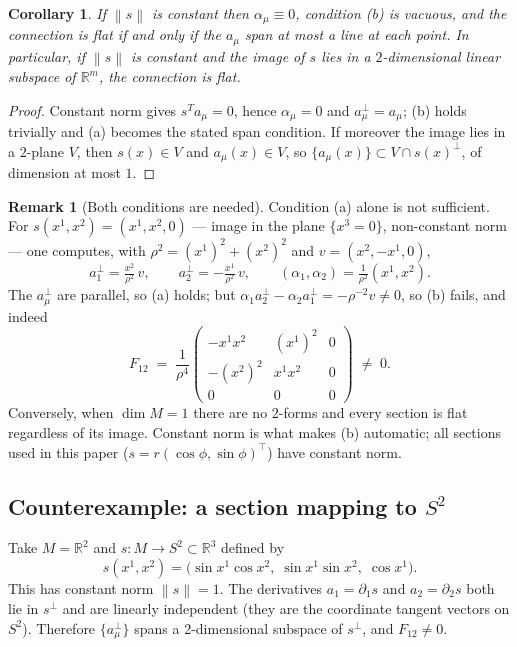 \documentclass[11pt, a4paper]{article}
\theoremstyle{plain}
\newtheorem{corollary}[theorem]{Corollary}
\theoremstyle{definition}
\newtheorem{remark}[theorem]{Remark}
\newcommand{\R}{\mathbb{R}}
\newcommand{\del}{\partial}
\newcommand{\norm}[1]{\left\|#1\right\|}
\begin{document}
\begin{corollary}\label{cor:flat-constant-norm}
If $\norm{s}$ is constant then $\alpha_\mu \equiv 0$, condition (b) is vacuous,
and the connection is flat if and only if the $a_\mu$ span at most a line at each
point. In particular, if $\norm{s}$ is constant and the image of $s$ lies in a
$2$-dimensional linear subspace of $\R^m$, the connection is flat.
\end{corollary}

\begin{proof}
Constant norm gives $s^T a_\mu = 0$, hence $\alpha_\mu = 0$ and
$a_\mu^\perp = a_\mu$; (b) holds trivially and (a) becomes the stated span
condition. If moreover the image lies in a $2$-plane $V$, then $s(x) \in V$ and
$a_\mu(x) \in V$, so $\{a_\mu(x)\} \subset V \cap s(x)^\perp$, of dimension at
most $1$.
\end{proof}

\begin{remark}[Both conditions are needed]
Condition (a) alone is not sufficient. For $s(x^1,x^2) = (x^1,x^2,0)$ --- image
in the plane $\{x^3=0\}$, non-constant norm --- one computes, with
$\rho^2 = (x^1)^2+(x^2)^2$ and $v = (x^2,-x^1,0)$,
\[
  a_1^\perp = \tfrac{x^2}{\rho^2}\,v, \qquad
  a_2^\perp = -\tfrac{x^1}{\rho^2}\,v, \qquad
  (\alpha_1,\alpha_2) = \tfrac{1}{\rho^2}(x^1,x^2).
\]
The $a_\mu^\perp$ are parallel, so (a) holds; but
$\alpha_1 a_2^\perp - \alpha_2 a_1^\perp = -\rho^{-2} v \neq 0$, so (b) fails,
and indeed
\[
  F_{12} \;=\; \frac{1}{\rho^4}
  \begin{pmatrix} -x^1x^2 & (x^1)^2 & 0 \\
                  -(x^2)^2 & x^1x^2 & 0 \\
                  0 & 0 & 0 \end{pmatrix} \;\neq\; 0 .
\]
Conversely, when $\dim M = 1$ there are no $2$-forms and every section is flat
regardless of its image. Constant norm is what makes (b) automatic; all sections
used in this paper ($s = r(\cos\phi,\sin\phi)^\top$) have constant norm.
\end{remark}

\subsection{Counterexample: a section mapping to $S^2$}

Take $M = \R^2$ and $s: M \to S^2 \subset \R^3$ defined by
\[
  s(x^1,x^2) = \bigl(\sin x^1\cos x^2,\;\sin x^1\sin x^2,\;\cos x^1\bigr).
\]
This has constant norm $\norm{s} = 1$. The derivatives $a_1 = \del_1 s$ and
$a_2 = \del_2 s$ both lie in $s^\perp$ and are linearly independent (they are the
coordinate tangent vectors on $S^2$). Therefore $\{a_\mu^\perp\}$ spans a
2-dimensional subspace of $s^\perp$, and $F_{12} \neq 0$.
\end{document}
